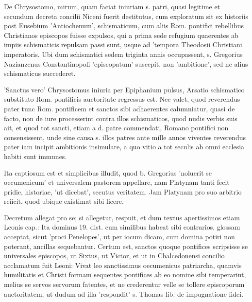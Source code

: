 De Chrysostomo, mirum, quam faciat iniuriam s. patri, quasi legitime et secundum decreta concilii Niceni fuerit destitutus, cum exploratum sit ex historiis post Eusebium 'Antiochenum', schismaticum, cum aliis Rom. pontifici rebellibus Christianos episcopos fuisse expulsos, qui a prima sede refugium quaerentes ab impiis schismaticis repulsam passi sunt, usque ad 'tempora Theodosii Christiani imperatoris. Ubi dum schismatici sedem triginta annis occupassent, s. Gregorius Nazianzenus Constantinopoli 'episcopatum' suscepit, non 'ambitione', sed ne alius schismaticus succederet.

'Sanctus vero' Chrysostomus iniuria per Epiphanium pulsus, Arsatio schismatico substituto Rom. pontificis auctoritate regressus est. Nec valet, quod reverendus pater tunc Rom. pontificem et sanctos sibi adhaerentes calumniatur, quasi de facto, non de iure processerint contra illos schismaticos, quod nudis verbis suis ait, et quod tot sancti, etiam a d. patre commendati, Romano pontifici non consensissent, unde sine causa s. illos patres ante mille annos viventes reverendus pater iam incipit ambitionis insimulare, a quo vitio a tot seculis ab omni ecclesia habiti sunt immunes.

Ita captiosum est et simplicibus illudit, quod b. Gregorius 'noluerit se oecumenicum' et universalem pastorem appellare, nam Platynam tanti fecit pridie, historiae, 'ut dicebat', secutus veritatem. Jam Platynam pro suo arbitrio reiicit, quod ubique existimat sibi licere.

Decretum allegat pro se; si allegetur, respuit, et dum textus apertissimos etiam Leonis cap.: Ita dominus 19. dist. cum similibus habeat sibi contrarios, glossam acceptat, sicut 'proci Penelopes', ut per iocum dicam, cum domina potiri non poterant, ancillas sequebantur. Certum est, sanctos quoque pontifices scripsisse se universales episcopos, ut Sixtus, ut Victor, et ut in Chalcedonensi concilio acclamatum fuit Leoni: Vivat leo sanctissimus oecumenicus patriarcha, quamvis humilitatis et Christi formam sequentes pontifices ab eo nomine sibi temperarint, melius se servos servorum fatentes, et ne crederentur velle se tollere episcoporum auctoritatem, ut dudum ad illa 'respondit' s. Thomas lib. de impugnatione fidei.

